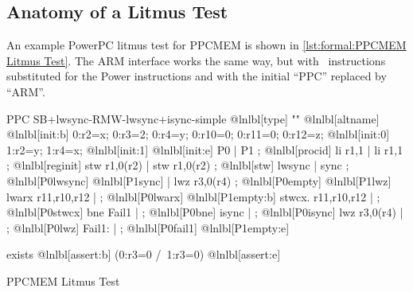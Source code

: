 \subsection{Anatomy of a Litmus Test}
\label{sec:formal:Anatomy of a Litmus Test}

An example PowerPC litmus test for PPCMEM is shown in
\cref{lst:formal:PPCMEM Litmus Test}.
The ARM interface works the same way, but with \ARM\ instructions
substituted for the Power instructions and with the initial ``PPC''
replaced by ``ARM''.

\begin{listing}
\begin{fcvlabel}
\begin{VerbatimL}[commandchars=\@\[\]]
PPC SB+lwsync-RMW-lwsync+isync-simple		@lnlbl[type]
""						@lnlbl[altname]
{						@lnlbl[init:b]
0:r2=x; 0:r3=2; 0:r4=y; 0:r10=0; 0:r11=0; 0:r12=z; @lnlbl[init:0]
1:r2=y; 1:r4=x;					@lnlbl[init:1]
}						@lnlbl[init:e]
 P0                 | P1           ;		@lnlbl[procid]
 li r1,1            | li r1,1      ;		@lnlbl[reginit]
 stw r1,0(r2)       | stw r1,0(r2) ;		@lnlbl[stw]
 lwsync             | sync         ; @lnlbl[P0lwsync] @lnlbl[P1sync]
                    | lwz r3,0(r4) ; @lnlbl[P0empty]  @lnlbl[P1lwz]
 lwarx  r11,r10,r12 | ;		@lnlbl[P0lwarx] @lnlbl[P1empty:b]
 stwcx. r11,r10,r12 | ;		@lnlbl[P0stwcx]
 bne Fail1          | ;		@lnlbl[P0bne]
 isync              | ;		@lnlbl[P0isync]
 lwz r3,0(r4)       | ;		@lnlbl[P0lwz]
 Fail1:             | ;		@lnlbl[P0fail1] @lnlbl[P1empty:e]

exists						@lnlbl[assert:b]
(0:r3=0 /\ 1:r3=0)				@lnlbl[assert:e]
\end{VerbatimL}
\end{fcvlabel}
\caption{PPCMEM Litmus Test}
\label{lst:formal:PPCMEM Litmus Test}
\end{listing}

